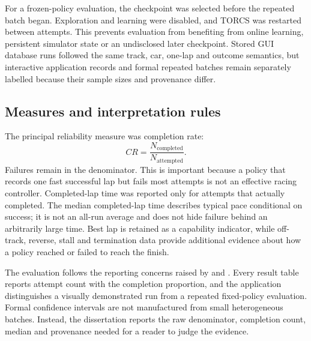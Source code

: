 For a frozen-policy evaluation, the checkpoint was selected before the repeated batch began. Exploration and learning were disabled, and TORCS was restarted between attempts. This prevents evaluation from benefiting from online learning, persistent simulator state or an undisclosed later checkpoint. Stored GUI database runs followed the same track, car, one-lap and outcome semantics, but interactive application records and formal repeated batches remain separately labelled because their sample sizes and provenance differ.

\subsection{Measures and interpretation rules}

The principal reliability measure was completion rate:
\begin{equation*}
  CR = \frac{N_{\text{completed}}}{N_{\text{attempted}}}.
\end{equation*}
Failures remain in the denominator. This is important because a policy that records one fast successful lap but fails most attempts is not an effective racing controller. Completed-lap time was reported only for attempts that actually completed. The median completed-lap time describes typical pace conditional on success; it is not an all-run average and does not hide failure behind an arbitrarily large time. Best lap is retained as a capability indicator, while off-track, reverse, stall and termination data provide additional evidence about how a policy reached or failed to reach the finish.

The evaluation follows the reporting concerns raised by \textcite{henderson2018} and \textcite{agarwal2021}. Every result table reports attempt count with the completion proportion, and the application distinguishes a visually demonstrated run from a repeated fixed-policy evaluation. Formal confidence intervals are not manufactured from small heterogeneous batches. Instead, the dissertation reports the raw denominator, completion count, median and provenance needed for a reader to judge the evidence.

